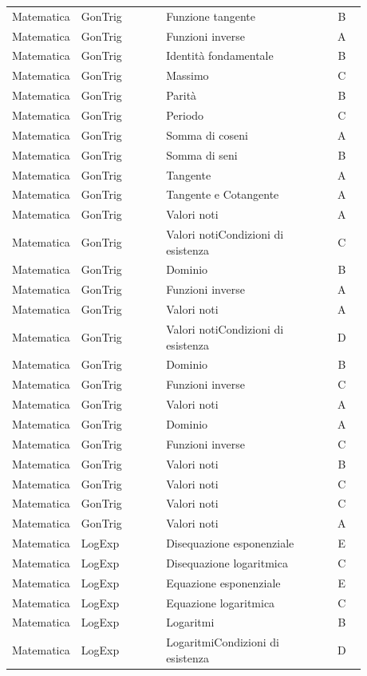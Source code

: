 \documentclass[20pt, a4paper]{article}
\begin{document}
\begin{longtable}{@{}>{\raggedright\arraybackslash}p{0.18\linewidth}>{\raggedright\arraybackslash}p{0.24\linewidth}>{\raggedright\arraybackslash}p{0.46\linewidth}c@{}}
Matematica & GonTrig & Funzione tangente & B \\
Matematica & GonTrig & Funzioni inverse & A \\
Matematica & GonTrig & Identità fondamentale & B \\
Matematica & GonTrig & Massimo & C \\
Matematica & GonTrig & Parità & B \\
Matematica & GonTrig & Periodo & C \\
Matematica & GonTrig & Somma di coseni & A \\
Matematica & GonTrig & Somma di seni & B \\
Matematica & GonTrig & Tangente & A \\
Matematica & GonTrig & Tangente e Cotangente & A \\
Matematica & GonTrig & Valori noti & A \\
Matematica & GonTrig & Valori notiCondizioni di esistenza & C \\
Matematica & GonTrig & Dominio & B \\
Matematica & GonTrig & Funzioni inverse & A \\
Matematica & GonTrig & Valori noti & A \\
Matematica & GonTrig & Valori notiCondizioni di esistenza & D \\
Matematica & GonTrig & Dominio & B \\
Matematica & GonTrig & Funzioni inverse & C \\
Matematica & GonTrig & Valori noti & A \\
Matematica & GonTrig & Dominio & A \\
Matematica & GonTrig & Funzioni inverse & C \\
Matematica & GonTrig & Valori noti & B \\
Matematica & GonTrig & Valori noti & C \\
Matematica & GonTrig & Valori noti & C \\
Matematica & GonTrig & Valori noti & A \\
Matematica & LogExp & Disequazione esponenziale & E \\
Matematica & LogExp & Disequazione logaritmica & C \\
Matematica & LogExp & Equazione esponenziale & E \\
Matematica & LogExp & Equazione logaritmica & C \\
Matematica & LogExp & Logaritmi & B \\
Matematica & LogExp & LogaritmiCondizioni di esistenza & D \\

\end{longtable}
\end{document}
